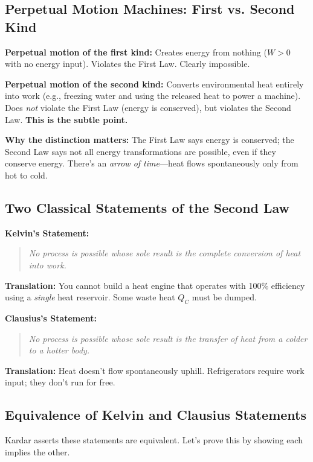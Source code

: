 \documentclass[9pt,twocoloumn]{article}
\begin{document}
\subsection{Perpetual Motion Machines: First vs. Second Kind}

\textbf{Perpetual motion of the first kind:} Creates energy from nothing ($W > 0$ with no energy input). Violates the First Law. Clearly impossible.

\textbf{Perpetual motion of the second kind:} Converts environmental heat entirely into work (e.g., freezing water and using the released heat to power a machine). Does \emph{not} violate the First Law (energy is conserved), but violates the Second Law. \textbf{This is the subtle point.}

\textbf{Why the distinction matters:} The First Law says energy is conserved; the Second Law says not all energy transformations are possible, even if they conserve energy. There's an \emph{arrow of time}—heat flows spontaneously only from hot to cold.

\subsection{Two Classical Statements of the Second Law}

\textbf{Kelvin's Statement:}
\begin{quote}
\textit{No process is possible whose sole result is the complete conversion of heat into work.}
\end{quote}

\textbf{Translation:} You cannot build a heat engine that operates with 100\% efficiency using a \emph{single} heat reservoir. Some waste heat $Q_C$ must be dumped.

\textbf{Clausius's Statement:}
\begin{quote}
\textit{No process is possible whose sole result is the transfer of heat from a colder to a hotter body.}
\end{quote}

\textbf{Translation:} Heat doesn't flow spontaneously uphill. Refrigerators require work input; they don't run for free.

\subsection{Equivalence of Kelvin and Clausius Statements}
Kardar asserts these statements are equivalent. Let's prove this by showing each implies the other.
\end{document}
